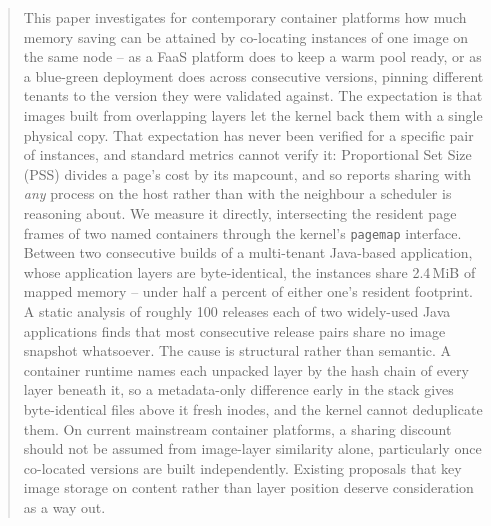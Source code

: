 \documentclass[sigplan,10pt,natbib=false]{acmart}
\begin{document}
\begin{abstract}
This paper investigates for contemporary container platforms how much
memory saving can be attained by co-locating instances of one image on
the same node -- as a FaaS platform does to keep a warm pool ready, or
as a blue-green deployment does across consecutive versions, pinning
different tenants to the version they were validated against. The
expectation is that images
built from overlapping layers let the kernel back them with a single
physical copy.  That expectation has never been verified for a specific pair of
instances, and standard metrics cannot verify it: Proportional Set
Size (PSS) divides a page's cost by its mapcount, and so reports
sharing with \emph{any} process on the host rather than with the
neighbour a scheduler is reasoning about.
We measure it directly, intersecting the resident page frames of two named containers through
the kernel's \texttt{pagemap} interface. Between two consecutive
builds of a multi-tenant Java-based application, whose application layers are
byte-identical, the instances share 2.4\,MiB of mapped memory -- under
half a percent of either one's resident footprint. A static analysis
of roughly 100 releases each of two widely-used Java applications finds
that most consecutive release pairs share no image
snapshot whatsoever. The cause is structural rather than semantic. A
container runtime names each unpacked layer by the hash chain of every
layer beneath it, so a metadata-only difference early in the stack
gives byte-identical files above it fresh inodes, and the kernel
cannot deduplicate them. On current mainstream container platforms, a
sharing discount should not be assumed from image-layer similarity
alone, particularly once co-located versions are built independently.
Existing proposals that key image storage on content rather than
layer position deserve consideration as a way out.
\end{abstract}
\end{document}
